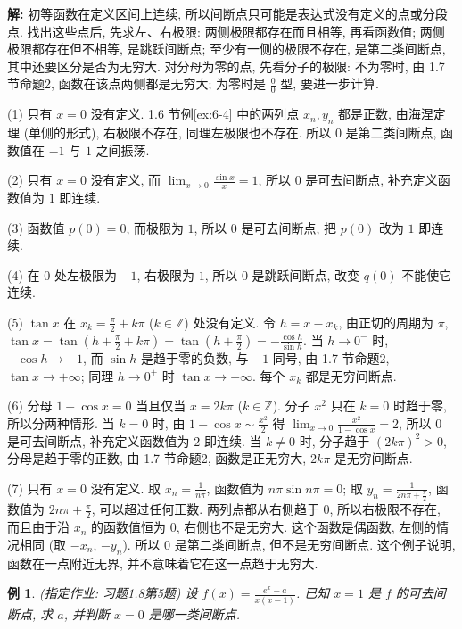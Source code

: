 \documentclass[UTF8,openany]{ctexbook}
\theoremstyle{chinesetextbook}
\newtheorem{example}{例}[section]
\newenvironment{cnsolution}{\par\indent\textbf{解:} \ignorespaces}{\par}
\begin{document}
\begin{cnsolution}
初等函数在定义区间上连续, 所以间断点只可能是表达式没有定义的点或分段点. 找出这些点后, 先求左、右极限: 两侧极限都存在而且相等, 再看函数值; 两侧极限都存在但不相等, 是跳跃间断点; 至少有一侧的极限不存在, 是第二类间断点, 其中还要区分是否为无穷大. 对分母为零的点, 先看分子的极限: 不为零时, 由 1.7 节命题2, 函数在该点两侧都是无穷大; 为零时是 $\displaystyle\frac00$ 型, 要进一步计算.

(1) 只有 $x=0$ 没有定义. 1.6 节例\ref{ex:6-4} 中的两列点 $x_n,y_n$ 都是正数, 由海涅定理 (单侧的形式), 右极限不存在, 同理左极限也不存在. 所以 $0$ 是第二类间断点, 函数值在 $-1$ 与 $1$ 之间振荡.

(2) 只有 $x=0$ 没有定义, 而 $\displaystyle\lim_{x\to0}\frac{\sin x}x=1$, 所以 $0$ 是可去间断点, 补充定义函数值为 $1$ 即连续.

(3) 函数值 $p(0)=0$, 而极限为 $1$, 所以 $0$ 是可去间断点, 把 $p(0)$ 改为 $1$ 即连续.

(4) 在 $0$ 处左极限为 $-1$, 右极限为 $1$, 所以 $0$ 是跳跃间断点, 改变 $q(0)$ 不能使它连续.

(5) $\tan x$ 在 $\displaystyle x_k=\frac\pi2+k\pi$ ($k\in\mathbb Z$) 处没有定义. 令 $h=x-x_k$, 由正切的周期为 $\pi$, $\displaystyle\tan x=\tan\left(h+\frac\pi2+k\pi\right)=\tan\left(h+\frac\pi2\right)=-\frac{\cos h}{\sin h}$. 当 $h\to0^-$ 时, $-\cos h\to-1$, 而 $\sin h$ 是趋于零的负数, 与 $-1$ 同号, 由 1.7 节命题2, $\tan x\to+\infty$; 同理 $h\to0^+$ 时 $\tan x\to-\infty$. 每个 $x_k$ 都是无穷间断点.

(6) 分母 $1-\cos x=0$ 当且仅当 $x=2k\pi$ ($k\in\mathbb Z$). 分子 $x^2$ 只在 $k=0$ 时趋于零, 所以分两种情形. 当 $k=0$ 时, 由 $\displaystyle1-\cos x\sim\frac{x^2}2$ 得 $\displaystyle\lim_{x\to0}\frac{x^2}{1-\cos x}=2$, 所以 $0$ 是可去间断点, 补充定义函数值为 $2$ 即连续. 当 $k\ne0$ 时, 分子趋于 $(2k\pi)^2>0$, 分母是趋于零的正数, 由 1.7 节命题2, 函数是正无穷大, $2k\pi$ 是无穷间断点.

(7) 只有 $x=0$ 没有定义. 取 $\displaystyle x_n=\frac1{n\pi}$, 函数值为 $n\pi\sin n\pi=0$; 取 $\displaystyle y_n=\frac1{2n\pi+\frac\pi2}$, 函数值为 $\displaystyle2n\pi+\frac\pi2$, 可以超过任何正数. 两列点都从右侧趋于 $0$, 所以右极限不存在, 而且由于沿 $x_n$ 的函数值恒为 $0$, 右侧也不是无穷大. 这个函数是偶函数, 左侧的情况相同 (取 $-x_n$, $-y_n$). 所以 $0$ 是第二类间断点, 但不是无穷间断点. 这个例子说明, 函数在一点附近无界, 并不意味着它在这一点趋于无穷大.
\end{cnsolution}
\begin{example}
\textnormal{(指定作业: 习题1.8第5题)} 设 $\displaystyle f(x)=\frac{e^x-a}{x(x-1)}$. 已知 $x=1$ 是 $f$ 的可去间断点, 求 $a$, 并判断 $x=0$ 是哪一类间断点.
\end{example}
\end{document}

